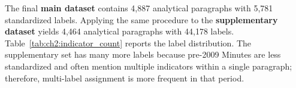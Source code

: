 The final \textbf{main dataset} contains 4,887 analytical paragraphs with 5,781 standardized labels. Applying the same procedure to the \textbf{supplementary dataset} yields 4,464 analytical paragraphs with 44,178 labels. Table~\ref{tab:ch2:indicator_count} reports the label distribution. The supplementary set has many more labels because pre-2009 Minutes are less standardized and often mention multiple indicators within a single paragraph; therefore, multi-label assignment is more frequent in that period.




